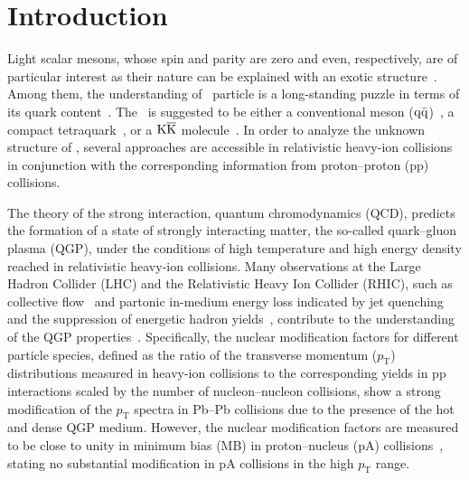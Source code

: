 
\section{Introduction}

Light scalar mesons, whose spin and parity are zero and even, respectively, are of particular interest as their nature can be explained with an exotic structure~\cite{ParticleDataGroup:2022pth}. Among them, the understanding of \fzero\ particle is a long-standing puzzle in terms of its quark content~\cite{ExHIC:2010gcb, Jaffe:1976ig, Maiani:2004uc}. The \fzero\ is suggested to be either a conventional meson ($\rm{}q\bar{q}$)~\cite{Chen:2003za}, a compact tetraquark~\cite{Achasov:2020aun}, or a $\rm{}K\overline{K}$ molecule~\cite{Ahmed:2020kmp}. In order to analyze the unknown structure of \fzero, several approaches are accessible in relativistic heavy-ion collisions in conjunction with the corresponding information from proton--proton (pp) collisions. 

The theory of the strong interaction, quantum chromodynamics (QCD), predicts the formation of a state of strongly interacting matter, the so-called quark--gluon plasma (QGP), under the conditions of high temperature and high energy density reached in relativistic heavy-ion collisions. Many observations at the Large Hadron Collider (LHC) and the Relativistic Heavy Ion Collider (RHIC), such as collective flow~\cite{Bhalerao:2020ulk, ALICE:2019zfl, Adams:2005dq, Adcox:2004mh} and partonic in-medium energy loss indicated by jet quenching~\cite{ALICE:2019qyj, ATLAS:2010isq, PHENIX:2010nlr} and the suppression of energetic hadron yields~\cite{ALICE:2019hno, PHENIX:2006ujp}, contribute to the understanding of the QGP properties~\cite{Heinz:2000bk, ALICE:2022wpn}. Specifically, the nuclear modification factors for different particle species, defined as the ratio of the transverse momentum ($p_{\mathrm{T}}$) distributions measured in heavy-ion collisions to the corresponding yields in pp interactions scaled by the number of nucleon--nucleon collisions, show a strong modification of the $p_{\mathrm{T}}$ spectra in Pb--Pb collisions due to the presence of the hot and dense QGP medium. However, the nuclear modification factors are measured to be close to unity in minimum bias (MB) in proton--nucleus (pA) collisions~\cite{ALICE:2016dei}, stating no substantial modification in pA collisions in the high $p_{\mathrm{T}}$ range. 

